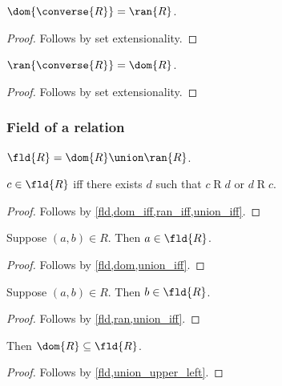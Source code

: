 \begin{proposition}\label{dom_converse}
    $\dom{\converse{R}} = \ran{R}$.
\end{proposition}
\begin{proof}
    Follows by set extensionality.
\end{proof}

\begin{proposition}\label{ran_converse}
    $\ran{\converse{R}} = \dom{R}$.
\end{proposition}
\begin{proof}
    Follows by set extensionality.
\end{proof}


\subsubsection{Field of a relation}

\begin{definition}\label{fld}
    $\fld{R} = \dom{R}\union\ran{R}$.
\end{definition}

\begin{proposition}\label{fld_iff}
    $c\in\fld{R}$ iff there exists $d$ such that $c\mathrel{R}d$ or $d\mathrel{R}c$.
\end{proposition}
\begin{proof}
    Follows by \cref{fld,dom_iff,ran_iff,union_iff}.
\end{proof}

\begin{proposition}\label{fld_intro_left}
    Suppose $(a,b)\in R$.
    Then $a\in\fld{R}$.
\end{proposition}
\begin{proof}
    Follows by \cref{fld,dom,union_iff}.
\end{proof}

\begin{proposition}\label{fld_intro_right}
    Suppose $(a,b)\in R$.
    Then $b\in\fld{R}$.
\end{proposition}
\begin{proof}
    Follows by \cref{fld,ran,union_iff}.
\end{proof}

\begin{proposition}\label{dom_subseteq_fld}
    Then $\dom{R}\subseteq\fld{R}$.
\end{proposition}
\begin{proof}
    Follows by \cref{fld,union_upper_left}.
\end{proof}


